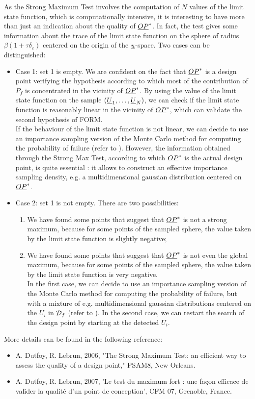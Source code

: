 {  As the Strong Maximum Test involves the computation of $N$ values of the limit state function, which is computationally intensive, it is interesting to have more than just an indication about the quality of ${\underline{OP}}^*$. In fact, the test gives some information about the trace of the limit state function on the sphere of radius $\beta(1+\tau \delta_{\varepsilon})$ centered on the origin of the ${\underline{u}}$-space. Two cases can be distinguished:
  \begin{itemize}
  \item Case 1: set 1 is empty. We are confident on the fact that ${\underline{OP}}^*$ is a design point verifying the hypothesis according to which most of the contribution of $P_f$ is concentrated in the vicinity of ${\underline{OP}}^*$. By using the value of the limit state function on the sample $({\underline{U}}_1, \dots, {\underline{U}}_N)$, we can check if the limit state function is reasonably linear in the vicinity of ${\underline{OP}}^*$, which can validate the second hypothesis of FORM. \\
    If the behaviour of the limit state function is not linear, we can decide to use an importance sampling version of the Monte Carlo method for computing the probability of failure (refer to ). However, the information obtained through the Strong Max Test, according to which ${\underline{OP}}^*$ is the actual design point, is quite essential : it allows to construct an effective importance sampling density, e.g. a multidimensional gaussian distribution centered on ${\underline{OP}}^*$.
  \item Case 2: set 1 is not empty. There are two possibilities:
    \begin{enumerate}
    \item We have found some points that suggest that ${\underline{OP}}^*$ is not a strong maximum, because for some points of the sampled sphere, the value taken by the limit state function is slightly negative;
    \item We have found some points that suggest that ${\underline{OP}}^*$ is not even the global maximum, because for some points of the sampled sphere, the value taken by the limit state function is very negative.\\
      In the first case, we can decide to use an importance sampling version of the Monte Carlo method for computing the probability of failure, but with a mixture of e.g. multidimensional gaussian distributions centered on the $U_i$ in ${\mathcal D}_f$ (refer to ).
      In the second case, we can restart the search of the design point by starting at the detected $U_i$.
    \end{enumerate}
  \end{itemize}
  More details can be found in the following reference:
  \begin{itemize}
  \item A. Dutfoy, R. Lebrun, 2006, "The Strong Maximum Test: an efficient way to assess the quality of a design point," PSAM8, New Orleans.
  \item A. Dutfoy, R. Lebrun, 2007, 'Le test du maximum fort : une façon efficace de valider la qualité d'un point de conception', CFM 07, Grenoble, France.
  \end{itemize}
}
